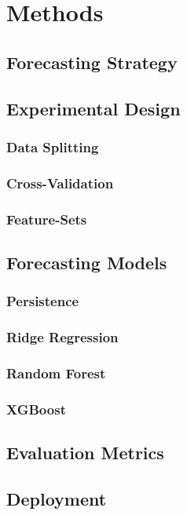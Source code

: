 \chapter{Methods}

\section{Forecasting Strategy }

\section{Experimental Design}

\subsection{Data Splitting}

\subsection{Cross-Validation}

\subsection{Feature-Sets}

\section{Forecasting Models}

\subsection{Persistence}

\subsection{Ridge Regression}

\subsection{Random Forest}

\subsection{XGBoost}

\section{Evaluation Metrics}



\section{Deployment}